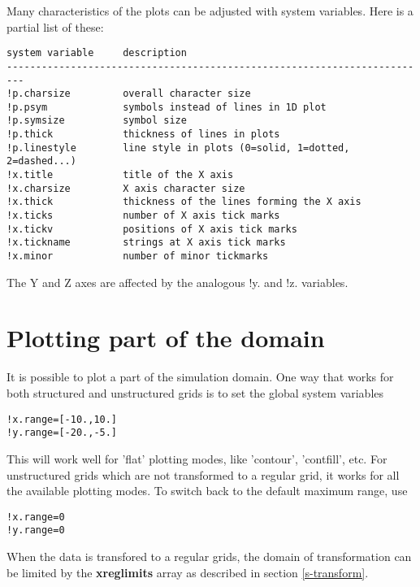 \documentclass{article}
\begin{document}
Many characteristics of the plots can be adjusted with system variables.
Here is a partial list of these:
\begin{verbatim}
system variable     description
-------------------------------------------------------------------------
!p.charsize         overall character size
!p.psym             symbols instead of lines in 1D plot
!p.symsize          symbol size
!p.thick            thickness of lines in plots
!p.linestyle        line style in plots (0=solid, 1=dotted, 2=dashed...)
!x.title            title of the X axis
!x.charsize         X axis character size
!x.thick            thickness of the lines forming the X axis
!x.ticks            number of X axis tick marks
!x.tickv            positions of X axis tick marks
!x.tickname         strings at X axis tick marks
!x.minor            number of minor tickmarks
\end{verbatim}
The Y and Z axes are affected by the analogous !y. and !z. variables.

\section{Plotting part of the domain \label{s-plot-part}}

It is possible to plot a part of the simulation domain.
One way that works for both structured and unstructured grids is
to set the global system variables
\begin{verbatim}
!x.range=[-10.,10.]
!y.range=[-20.,-5.]
\end{verbatim}
This will work well for 'flat' plotting modes, like 'contour',
'contfill', etc. For unstructured grids which are not transformed
to a regular grid, it works for all the available plotting modes.
To switch back to the default maximum range, use
\begin{verbatim}
!x.range=0
!y.range=0
\end{verbatim}
When the data is transfored to a regular grids, the domain of transformation
can be limited by the {\bf xreglimits} array as described in section
\ref{s-transform}. 
\end{document}
